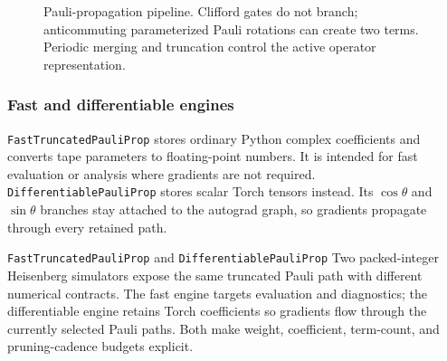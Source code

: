 \documentclass[10pt]{article}
\newcommand{\code}[1]{\texttt{#1}}
\begin{document}
\begin{figure}[t]
\centering
{}
\caption{Pauli-propagation pipeline.  Clifford gates do not branch; anticommuting parameterized Pauli rotations can create two terms.  Periodic merging and truncation control the active operator representation.}
\label{fig:pp}
\end{figure}

\subsubsection{Fast and differentiable engines}

\code{FastTruncatedPauliProp} stores ordinary Python complex coefficients and converts tape parameters to floating-point numbers.  It is intended for fast evaluation or analysis where gradients are not required.  \code{DifferentiablePauliProp} stores scalar Torch tensors instead.  Its $\cos\theta$ and $\sin\theta$ branches stay attached to the autograd graph, so gradients propagate through every retained path.

\begin{qaspfeature}{\code{FastTruncatedPauliProp} and \code{DifferentiablePauliProp}}
Two packed-integer Heisenberg simulators expose the same truncated Pauli path
with different numerical contracts.  The fast engine targets evaluation and
diagnostics; the differentiable engine retains Torch coefficients so gradients
flow through the currently selected Pauli paths.  Both make weight,
coefficient, term-count, and pruning-cadence budgets explicit.
\end{qaspfeature}
\end{document}

